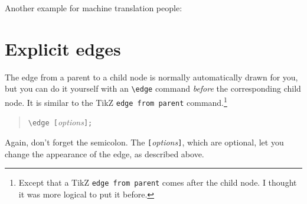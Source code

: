 \documentclass{article}
\begin{document}
\noindent Another example for machine translation people:
\begin{center}
\begin{SideBySideExample}
\end{SideBySideExample}
\end{center}

\section{Explicit edges}

The edge from a parent to a child node is normally automatically drawn
for you, but you can do it yourself with an \verb|\edge| command
\emph{before}\/ the corresponding child node. It is similar to the
TikZ \verb|edge from parent| command.\footnote{Except that a TikZ
\texttt{edge from parent} comes after the child node. I thought it was
more logical to put it before.}
\begin{quote}
\verb|\edge [|\textit{options}\verb|];|
\end{quote}
Again, don't forget the semicolon. The
\verb|[|\textit{options}\verb|]|, which are optional, let you change
the appearance of the edge, as described above.
\end{document}
